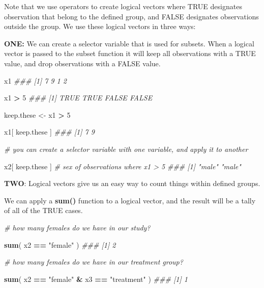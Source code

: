 \documentclass[]{book}
\newenvironment{Shaded}{\begin{snugshade}}{\end{snugshade}}
\newcommand{\CommentTok}[1]{\textcolor[rgb]{0.56,0.35,0.01}{\textit{#1}}}
\newcommand{\DecValTok}[1]{\textcolor[rgb]{0.00,0.00,0.81}{#1}}
\newcommand{\KeywordTok}[1]{\textcolor[rgb]{0.13,0.29,0.53}{\textbf{#1}}}
\newcommand{\NormalTok}[1]{#1}
\newcommand{\OperatorTok}[1]{\textcolor[rgb]{0.81,0.36,0.00}{\textbf{#1}}}
\newcommand{\StringTok}[1]{\textcolor[rgb]{0.31,0.60,0.02}{#1}}
\theoremstyle{definition}
\theoremstyle{definition}
\theoremstyle{definition}
\theoremstyle{remark}
\begin{document}
Note that we use operators to create logical vectors where TRUE
designates observation that belong to the defined group, and FALSE
designates observations outside the group. We use these logical vectors
in three ways:

\textbf{ONE:} We can create a selector variable that is used for
subsets. When a logical vector is passed to the subset function it will
keep all observations with a TRUE value, and drop observations with a
FALSE value.

\begin{Shaded}
\begin{Highlighting}[]

\NormalTok{x1}
\CommentTok{### [1] 7 9 1 2}

\NormalTok{x1 }\OperatorTok{>}\StringTok{ }\DecValTok{5}
\CommentTok{### [1]  TRUE  TRUE FALSE FALSE}

\NormalTok{keep.these <-}\StringTok{ }\NormalTok{x1 }\OperatorTok{>}\StringTok{ }\DecValTok{5}

\NormalTok{x1[ keep.these ]}
\CommentTok{### [1] 7 9}

\CommentTok{# you can create a selector variable with one variable, and apply it to another}

\NormalTok{x2[ keep.these ]  }\CommentTok{# sex of observations where x1 > 5}
\CommentTok{### [1] "male" "male"}
\end{Highlighting}
\end{Shaded}

\textbf{TWO}: Logical vectors give us an easy way to count things within
defined groups.

We can apply a \textbf{sum()} function to a logical vector, and the
result will be a tally of all of the TRUE cases.

\begin{Shaded}
\begin{Highlighting}[]

\CommentTok{# how many females do we have in our study?}

\KeywordTok{sum}\NormalTok{( x2 }\OperatorTok{==}\StringTok{ "female"}\NormalTok{ )}
\CommentTok{### [1] 2}

\CommentTok{# how many females do we have in our treatment group?}

\KeywordTok{sum}\NormalTok{( x2 }\OperatorTok{==}\StringTok{ "female"} \OperatorTok{&}\StringTok{ }\NormalTok{x3 }\OperatorTok{==}\StringTok{ "treatment"}\NormalTok{ )}
\CommentTok{### [1] 1}
\end{Highlighting}
\end{Shaded}
\end{document}
